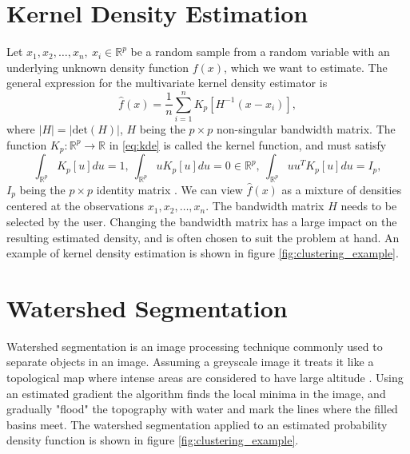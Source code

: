 \documentclass[a4paper]{memoir}
\theoremstyle{plain}
\theoremstyle{definition}
\theoremstyle{remark}
\begin{document}
\section{Kernel Density Estimation}\label{sec:kde}
Let $x_1, x_2, \hdots, x_n, \ x_i \in \mathbb{R}^p$ be a random sample from a random variable with an underlying unknown density function $f(x)$, which we want to estimate.
The general expression for the multivariate kernel density estimator is \cite{simonoff}
\begin{equation}\label{eq:kde}
        \hat{f}(x)   = \frac{1}{n} \sum_{i = 1}^{n} K_p \left[ H^{-1}(x - x_i) \right],
\end{equation}
where $|H| = |\text{det} (H)|$, $H$ being the $p \times p$ non-singular bandwidth matrix.
The function $K_p : \mathbb{R}^p \rightarrow \mathbb{R}$ in \eqref{eq:kde} is called the kernel function, and must satisfy
\begin{equation*}
        \int_{\mathbb{R}^p}^{} K_p [u]du = 1, \ \int_{\mathbb{R}^p}^{}uK_p [u]du = 0 \in \mathbb{R}^p, \ \int_{\mathbb{R}^p}^{} u u^T K_p [u]du = I_p,
\end{equation*}
$I_p$ being the $p \times p$ identity matrix \cite{simonoff}.
We can view $\hat{f}(x)$ as a mixture of densities centered at the observations $x_1, x_2, \hdots, x_n$.
The bandwidth matrix $H$ needs to be selected by the user.
Changing the bandwidth matrix has a large impact on the resulting estimated density, and is often chosen to suit the problem at hand.
An example of kernel density estimation is shown in figure \ref{fig:clustering_example}.







\section{Watershed Segmentation}
Watershed segmentation is an image processing technique commonly used to separate objects in an image.
Assuming a greyscale image it treats it like a topological map where intense areas are considered to have large altitude \cite{najman}.
Using an estimated gradient the algorithm finds the local minima in the image, and gradually "flood" the topography with water and mark the lines where the filled basins meet.
The watershed segmentation applied to an estimated probability density function is shown in figure \ref{fig:clustering_example}.
\end{document}
